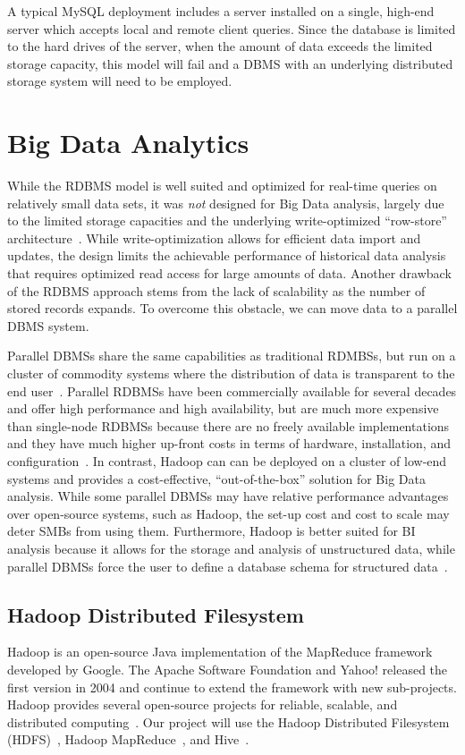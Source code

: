A typical MySQL deployment includes a server installed on a single, high-end server which accepts local and remote client queries. Since the database is limited to the hard drives of the server, when the amount of data exceeds the limited storage capacity, this model will fail and a DBMS with an underlying distributed storage system will need to be employed.
\section{Big Data Analytics}
While the RDBMS model is well suited and optimized for real-time queries on relatively small data sets, it was \textit{not} designed for Big Data analysis, largely due to the limited storage capacities and the underlying write-optimized ``row-store'' architecture~\cite{stonebraker}. While write-optimization allows for efficient data import and updates, the design limits the achievable performance of historical data analysis that requires optimized read access for large amounts of data. Another drawback of the RDBMS approach stems from the lack of scalability as the number of stored records expands. To overcome this obstacle, we can move data to a parallel DBMS system. 

Parallel DBMSs share the same capabilities as traditional RDMBSs, but run on a cluster of commodity systems where the distribution of data is transparent to the end user~\cite{pavlo}. Parallel RDBMSs have been commercially available for several decades and offer high performance and high availability, but are much more expensive than single-node RDBMSs because there are no freely available implementations and they have much higher up-front costs in terms of hardware, installation, and configuration~\cite{stonebraker2010mapreduce}. In contrast, Hadoop can can be deployed on a cluster of low-end systems and provides a cost-effective, ``out-of-the-box'' solution for Big Data analysis.  While some parallel DBMSs may have relative performance advantages over open-source systems, such as Hadoop, the set-up cost and cost to scale may deter SMBs from using them. Furthermore, Hadoop is better suited for BI analysis because it allows for the storage and analysis of unstructured data, while parallel DBMSs force the user to define a database schema for structured data~\cite{pavlo}.

\subsection{Hadoop Distributed Filesystem}
Hadoop is an open-source Java implementation of the MapReduce framework developed by Google. The Apache Software Foundation and Yahoo! released the
first version in 2004 and continue to extend the framework with new sub-projects. Hadoop provides several open-source projects for reliable, scalable, and distributed computing~\cite{hadoop}. Our project will use the Hadoop Distributed Filesystem (HDFS)~\cite{hdfs}, Hadoop MapReduce~\cite{mapreduce}, and Hive~\cite{hive}.

